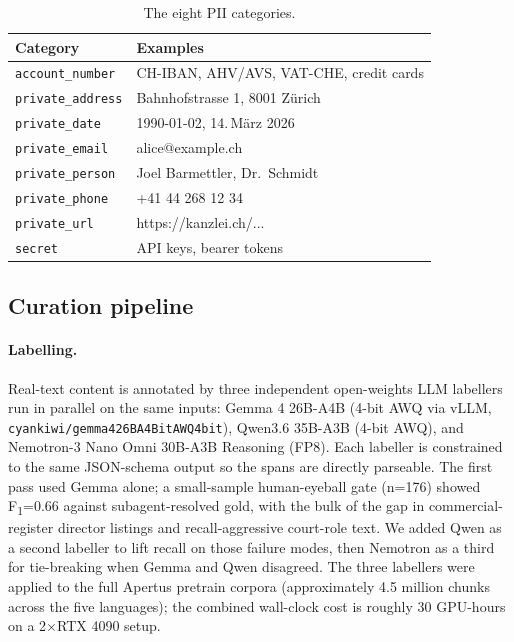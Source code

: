 \documentclass[sigconf,nonacm]{acmart}
\newcommand*{\Bhy}{\discretionary{-}{}{-}}%
\begin{document}
\begin{table}[h]
\centering
\caption{The eight PII categories.}
\label{tab:cats}
\small
\begin{tabular}{l l}
\toprule
Category               & Examples \\
\midrule
\texttt{account\_number} & CH-IBAN, AHV/AVS, VAT-CHE, credit cards \\
\texttt{private\_address} & Bahnhofstrasse 1, 8001 Zürich \\
\texttt{private\_date}   & 1990-01-02, 14.\,M\"arz 2026 \\
\texttt{private\_email}  & alice@example.ch \\
\texttt{private\_person} & Joel Barmettler, Dr.\ Schmidt \\
\texttt{private\_phone}  & +41 44 268 12 34 \\
\texttt{private\_url}    & https://kanzlei.ch/...{} \\
\texttt{secret}          & API keys, bearer tokens \\
\bottomrule
\end{tabular}
\end{table}

\subsection{Curation pipeline}

\paragraph{Labelling.} Real-text content is annotated by three
independent open-weights LLM labellers run in parallel on the same
inputs: \textsf{Gemma 4 26B-A4B} (4-bit AWQ via vLLM,
\texttt{cyankiwi/gemma\Bhy 4\Bhy 26B\Bhy A4B\Bhy it\Bhy AWQ\Bhy 4bit}),
\textsf{Qwen3.6 35B-A3B} (4-bit AWQ), and \textsf{Nemotron-3 Nano
Omni 30B-A3B Reasoning} (FP8). Each labeller is constrained to the
same JSON-schema output so the spans are directly parseable. The
first pass used Gemma alone; a small-sample human-eyeball gate
(n=176) showed F\textsubscript{1}=0.66 against subagent-resolved gold,
with the bulk of the gap in commercial-register director listings
and recall-aggressive court-role text. We added Qwen as a second
labeller to lift recall on those failure modes, then Nemotron as a
third for tie-breaking when Gemma and Qwen disagreed. The three
labellers were applied to the full Apertus pretrain corpora
(approximately 4.5 million chunks across the five languages); the
combined wall-clock cost is roughly 30 GPU-hours on a
2$\times$RTX 4090 setup.
\end{document}
